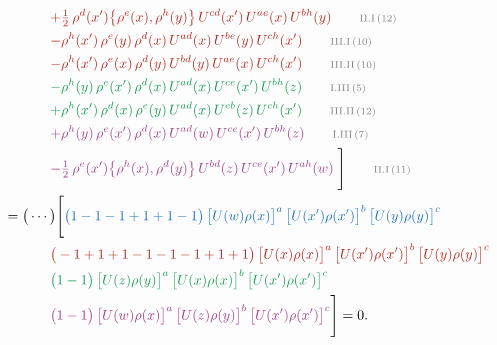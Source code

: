 \documentclass[10pt]{article}
\begin{document}
\begin{align}
&\qquad{\color{BrickRed}+\tfrac{1}{2}\,\rho^{d}(x')\big\{\rho^{e}(x),\rho^{h}(y)\big\}\,U^{cd}(x')\,U^{ae}(x)\,U^{bh}(y)}\tag*{\color{gray}\scriptsize II.I\,(12)}\\
&\qquad{\color{BrickRed}-\rho^{h}(x')\,\rho^{e}(y)\,\rho^{d}(x)\,U^{ad}(x)\,U^{be}(y)\,U^{ch}(x')}\tag*{\color{gray}\scriptsize III.I\,(10)}\\
&\qquad{\color{BrickRed}-\rho^{h}(x')\,\rho^{e}(x)\,\rho^{d}(y)\,U^{bd}(y)\,U^{ae}(x)\,U^{ch}(x')}\tag*{\color{gray}\scriptsize III.II\,(10)}\\
&\qquad{\color{ForestGreen}-\rho^{h}(y)\,\rho^{e}(x')\,\rho^{d}(x)\,U^{ad}(x)\,U^{ce}(x')\,U^{bh}(z)}\tag*{\color{gray}\scriptsize I.III\,(5)}\\
&\qquad{\color{ForestGreen}+\rho^{h}(x')\,\rho^{d}(x)\,\rho^{e}(y)\,U^{ad}(x)\,U^{eb}(z)\,U^{ch}(x')}\tag*{\color{gray}\scriptsize III.II\,(12)}\\
&\qquad{\color{DarkOrchid}+\rho^{h}(y)\,\rho^{e}(x')\,\rho^{d}(x)\,U^{ad}(w)\,U^{ce}(x')\,U^{bh}(z)}\tag*{\color{gray}\scriptsize I.III\,(7)}\\
&\qquad{\color{DarkOrchid}-\tfrac{1}{2}\,\rho^{e}(x')\big\{\rho^{h}(x),\rho^{d}(y)\big\}\,U^{bd}(z)\,U^{ce}(x')\,U^{ah}(w)}\;\Bigg]\tag*{\color{gray}\scriptsize II.I\,(11)}\\
={}&\big(\cdots\big)\Bigg[{\color{RoyalBlue}\big(1-1-1+1+1-1\big)\,\big[U(w)\rho(x)\big]^{a}\,\big[U(x')\rho(x')\big]^{b}\,\big[U(y)\rho(y)\big]^{c}}\notag\\
&\qquad{\color{BrickRed}\big(-1+1+1-1-1-1+1+1\big)\,\big[U(x)\rho(x)\big]^{a}\,\big[U(x')\rho(x')\big]^{b}\,\big[U(y)\rho(y)\big]^{c}}\notag\\
&\qquad{\color{ForestGreen}\big(1-1\big)\,\big[U(z)\rho(y)\big]^{a}\,\big[U(x)\rho(x)\big]^{b}\,\big[U(x')\rho(x')\big]^{c}}\notag\\
&\qquad{\color{DarkOrchid}\big(1-1\big)\,\big[U(w)\rho(x)\big]^{a}\,\big[U(z)\rho(y)\big]^{b}\,\big[U(x')\rho(x')\big]^{c}}\Bigg]=0.
\end{align}
\end{document}
